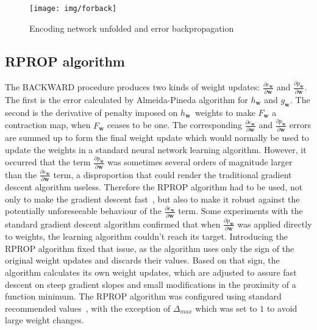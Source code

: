 \documentclass[]{spie}  %
\newcommand{\bm}[1]{\boldsymbol{#1}}
\begin{document}
\begin{figure}[h!]
\begin{center}
	\texttt{[image: img/forback]}
	\caption{Encoding network unfolded and error backpropagation}
	\label{fig:forward}
	\label{fig:backward}
\end{center}
\end{figure}

\subsection{RPROP algorithm}
The BACKWARD procedure produces two kinds of weight updates: $\frac{\partial e_{\bm{w}}}{\partial \bm{w}}$ and $\frac{\partial p_{\bm{w}}}{\partial \bm{w}}$. The first is the error calculated by Almeida-Pineda algorithm for $h_{\bm{w}}$ and $g_{\bm{w}}$. The second is the derivative of penalty imposed on $h_{\bm{w}}$~weights to make $F_{\bm{w}}$ a contraction map, when $F_{\bm{w}}$ ceases to be one. The corresponding $\frac{\partial e_{\bm{w}}}{\partial \bm{w}}$ and $\frac{\partial p_{\bm{w}}}{\partial \bm{w}}$ errors are summed up to form the final weight update which would normally be used to update the weights in a standard neural network learning algorithm. However, it occurred that the term $\frac{\partial p_{\bm{w}}}{\partial \bm{w}}$ was sometimes several orders of magnitude larger than the $\frac{\partial e_{\bm{w}}}{\partial \bm{w}}$ term, a disproportion that could render the traditional gradient descent algorithm useless. Therefore the RPROP algorithm had to be used, not only to make the gradient descent fast~\cite{scarselli2009graph}, but also to make it robust against the potentially unforeseeable behaviour of the  $\frac{\partial e_{\bm{w}}}{\partial \bm{w}}$ term. Some experiments with the standard gradient descent algorithm confirmed that when $\frac{\partial p_{\bm{w}}}{\partial \bm{w}}$ was applied directly to weights, the learning algorithm couldn't reach its target. Introducing the RPROP algorithm fixed that issue, as the algorithm uses only the sign of the original weight updates and discards their values. Based on that sign, the algorithm calculates its own weight updates, which are adjusted to assure fast descent on steep gradient slopes and small modifications in the proximity of a function minimum. The RPROP algorithm was configured using standard recommended values~\cite{riedmiller1993direct}, with the exception of $\Delta_{max}$ which was set to $1$ to avoid large weight changes. 

\newpage
\end{document}
